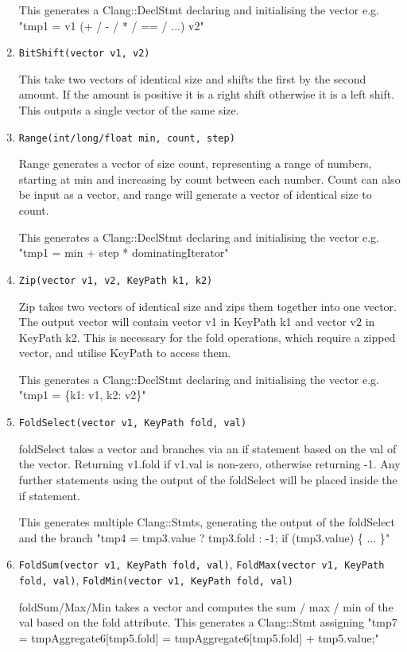 \begin{enumerate}
This generates a Clang::DeclStmt declaring and initialising the vector e.g. "tmp1 = v1 (+ / - / * / == / ...) v2"

\item \texttt{BitShift(vector v1, v2)}

This take two vectors of identical size and shifts the first by the second amount. If the amount is positive it is a right shift otherwise it is a left shift. This outputs a single vector of the same size.

\item \texttt{Range(int/long/float min, count, step)}

Range generates a vector of size count, representing a range of numbers, starting at min and increasing by count between each number. Count can also be input as a vector, and range will generate a vector of identical size to count. 

This generates a Clang::DeclStmt declaring and initialising the vector e.g. "tmp1 = min + step * dominatingIterator"

\item \texttt{Zip(vector v1, v2, KeyPath k1, k2)}

Zip takes two vectors of identical size and zips them together into one vector. The output vector will contain vector v1 in KeyPath k1 and vector v2 in KeyPath k2. This is necessary for the fold operations, which require a zipped vector, and utilise KeyPath to access them.

This generates a Clang::DeclStmt declaring and initialising the vector e.g. "tmp1 = \{{k1: v1, k2: v2\}}"

\item \texttt{FoldSelect(vector v1, KeyPath fold, val)}

foldSelect takes a vector and branches via an if statement based on the val of the vector. Returning v1.fold if v1.val is non-zero, otherwise returning -1. Any further statements using the output of the foldSelect will be placed inside the if statement.

This generates multiple Clang::Stmts, generating the output of the foldSelect and the branch "tmp4 = tmp3.value ? tmp3.fold : -1;
if (tmp3.value) \{{ ... \}}"

\item \texttt{FoldSum(vector v1, KeyPath fold, val)}, \texttt{FoldMax(vector v1, KeyPath fold, val)}, \texttt{FoldMin(vector v1, KeyPath fold, val)}

foldSum/Max/Min takes a vector and computes the sum / max / min of the val based on the fold attribute. This generates a Clang::Stmt assigning 
"tmp7 = tmpAggregate6[tmp5.fold] = tmpAggregate6[tmp5.fold] + tmp5.value;"


\end{enumerate}
